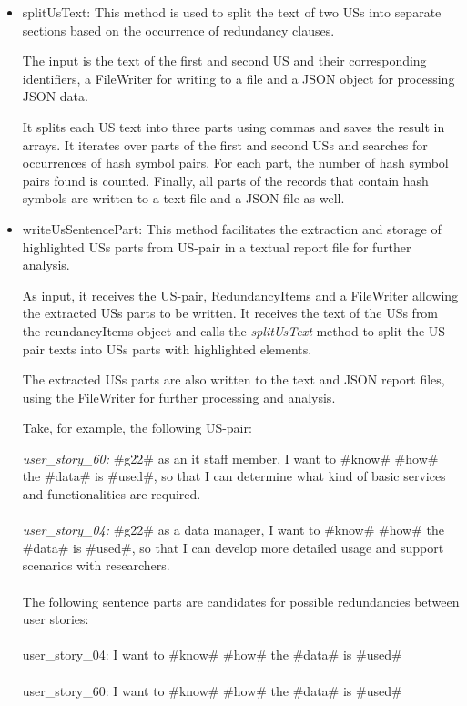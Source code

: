 \begin{itemize}
	
	\item splitUsText: This method is used to split the text of two USs into separate sections based on the occurrence of redundancy clauses. 
	
	The input is the text of the first and second US and their corresponding identifiers, a FileWriter for writing to a file and a JSON object for processing JSON data. 
	
	It splits each US text into three parts using commas and saves the result in arrays. It iterates over parts of the first and second USs and searches for occurrences of hash symbol pairs. For each part, the number of hash symbol pairs found is counted. Finally, all parts of the records that contain hash symbols are written to a text file and a JSON file as well.
	
	\item writeUsSentencePart: This method facilitates the extraction and storage of highlighted USs parts from US-pair in a textual report file for further analysis.
	
	As input, it receives the US-pair, RedundancyItems and a FileWriter allowing the extracted USs parts to be written. It receives the text of the USs from the reundancyItems object and calls the \textit{splitUsText} method to split the US-pair texts into USs parts with highlighted elements.
	
	The extracted USs parts are also written to the text and JSON report files, using the FileWriter for further processing and analysis.
	
	\begin{example}
		Take, for example, the following US-pair:
		
		\textit{user\_story\_60:} \#g22\# as an it staff member, I want to \#know\# \#how\# the \#data\# is \#used\#, so that I can determine what kind of basic services and functionalities are required.\\\\
		\textit{user\_story\_04:} \#g22\# as a data manager, I want to \#know\# \#how\# the \#data\# is \#used\#, so that I can develop more detailed usage and support scenarios with researchers.\\\\
		The following sentence parts are candidates for possible redundancies between user stories:\\\\
		user\_story\_04:  I want to \#know\# \#how\# the \#data\# is \#used\#\\\\
		user\_story\_60:  I want to \#know\# \#how\# the \#data\# is \#used\#	
	\end{example}
\end{itemize}
